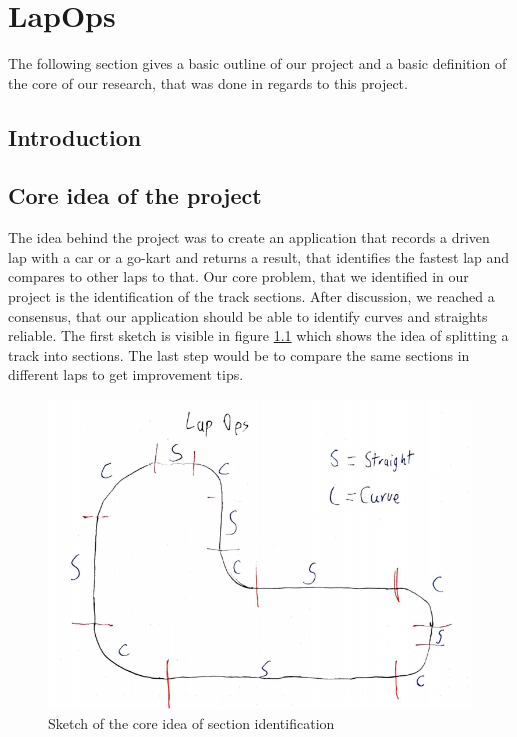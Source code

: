 \chapter{LapOps}
The following section gives a basic outline of our project and a basic definition of the core of our research, that was done in regards to this project.

\section{Introduction}


\section{Core idea of the project}
The idea behind the project was to create an application that records a driven lap with a car or a go-kart and returns a result, that identifies the fastest lap and compares to other laps to that. Our core problem, that we identified in our project is the identification of the track sections. After discussion, we reached a consensus, that our application should be able to identify curves and straights reliable. The first sketch is visible in figure \ref{sketchLapOps} which shows the idea of splitting a track into sections. The last step would be to compare the same sections in different laps to get improvement tips.

\begin{figure}[H]
	\centering
	\includegraphics[scale= 0.6]{Pictures/LapOpsSkizze.png}
	\caption{Sketch of the core idea of section identification}
	\label{sketchLapOps}
\end{figure}
